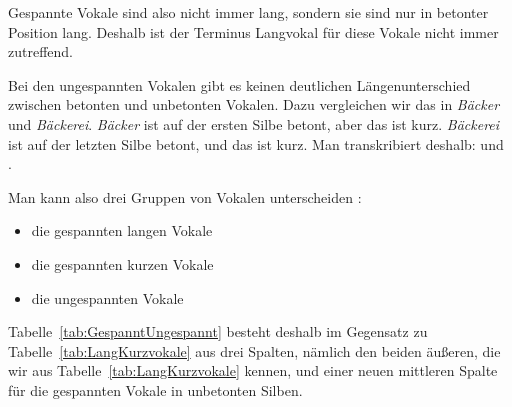 Gespannte Vokale sind also nicht immer lang, sondern sie sind nur in betonter Position lang. Deshalb ist der Terminus Langvokal für diese Vokale nicht immer zutreffend.

Bei den ungespannten Vokalen gibt es keinen deutlichen Längenunterschied zwischen betonten und unbetonten Vokalen. Dazu vergleichen wir das \textipa{[E]} in \textit{Bäcker} und \textit{Bäckerei}. \textit{Bäcker} ist auf der ersten Silbe betont, aber das \textipa{[E]} ist kurz. \textit{Bäckerei} ist auf der letzten Silbe betont, und das \textipa{[E]} ist kurz. Man transkribiert deshalb: \textipa{[\textprimstress bE\.*k5]} und \textipa{[bE\.*k@\textprimstress K\t*{aI}]}.

Man kann also drei Gruppen von Vokalen unterscheiden \citep[120--121]{Jessen2010}: 
\begin{itemize}
    \item die gespannten langen Vokale
    \item die gespannten kurzen Vokale
    \item die ungespannten Vokale
\end{itemize}

Tabelle~\ref{tab:GespanntUngespannt} besteht deshalb im Gegensatz zu Tabelle~\ref{tab:LangKurzvokale} aus drei Spalten, nämlich den beiden äußeren, die wir aus Tabelle~\ref{tab:LangKurzvokale} kennen, und einer neuen mittleren Spalte für die gespannten Vokale in unbetonten Silben.

